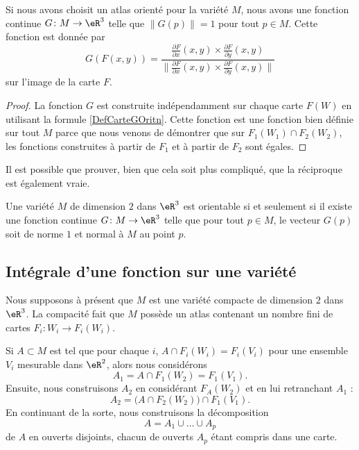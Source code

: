 \begin{corollary}
	Si nous avons choisit un atlas orienté pour la variété $M$, nous avons une fonction continue $G\colon M\to \eR^3$ telle que $\| G(p) \|=1$ pour tout $p\in M$. Cette fonction est donnée par
	\begin{equation}		\label{DefCarteGOritn}
		G(F(x,y))=\frac{   \frac{ \partial F }{ \partial x }(x,y)\times\frac{ \partial F }{ \partial y }(x,y)   }{ \| \frac{ \partial F }{ \partial x }(x,y)\times\frac{ \partial F }{ \partial y }(x,y)\| }
	\end{equation}
	sur l'image de la carte $F$.
\end{corollary}

\begin{proof}
	La fonction $G$ est construite indépendamment sur chaque carte $F(W)$ en utilisant la formule \eqref{DefCarteGOritn}. Cette fonction est une fonction bien définie sur tout $M$ parce que nous venons de démontrer que sur $F_1(W_1)\cap F_2(W_2)$, les fonctions construites à partir de $F_1$ et à partir de $F_2$ sont égales.
\end{proof}

Il est possible que prouver, bien que cela soit plus compliqué, que la réciproque est également vraie.
\begin{proposition}
	Une variété $M$ de dimension $2$ dans $\eR^3$ est orientable si et seulement si il existe une fonction continue $G\colon M\to \eR^3$ telle que pour tout $p\in M$, le vecteur $G(p)$ soit de norme $1$ et normal à $M$ au point $p$.
\end{proposition}

\subsection{Intégrale d'une fonction sur une variété}

Nous supposons à présent que $M$ est une variété compacte de dimension $2$ dans $\eR^3$. La compacité fait que $M$ possède un atlas contenant un nombre fini de cartes $F_i\colon W_i\to F_i(W_i)$. 

Si $A\subset M$ est tel que pour chaque $i$, $A\cap F_i(W_i)=F_i(V_i)$ pour une ensemble $V_i$ mesurable dans $\eR^2$, alors nous considérons
\begin{equation}
	A_1=A\cap F_1(W_2)=F_1(V_1).
\end{equation}
Ensuite, nous construisons $A_2$ en considérant $F_A(W_2)$ et en lui retranchant $A_1$ :
\begin{equation}
	A_2=\big( A\cap F_2(W_2) \big)\cap F_1(V_1).
\end{equation}
En continuant de la sorte, nous construisons la décomposition
\begin{equation}
	A=A_1\cup\ldots\cup A_p
\end{equation}
de $A$ en ouverts disjoints, chacun de ouverts $A_p$ étant compris dans une carte.

